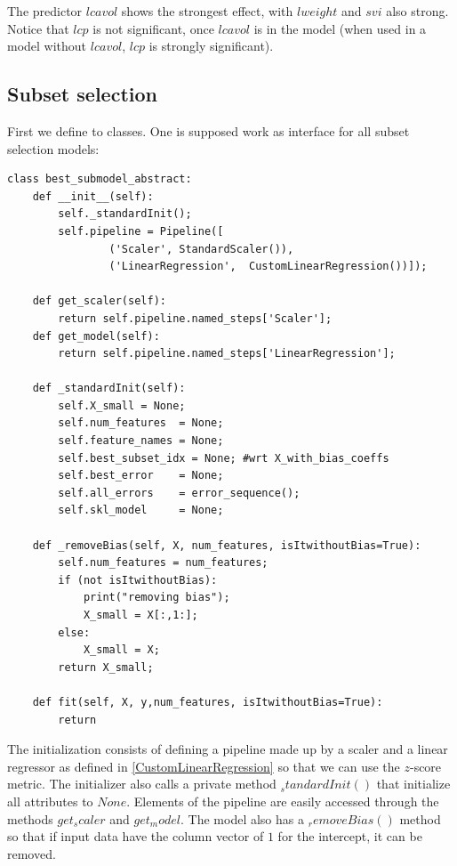\documentclass[12pt, letterpaper]{article}
\theoremstyle{definition}
\begin{document}
The predictor $lcavol$ shows the strongest effect, with $lweight$ and $svi$ also strong. Notice that $lcp$ is not significant, once $lcavol$ is in the model (when used in a model without $lcavol$, $lcp$ is strongly significant).

\subsection{Subset selection}
First we define to classes. One is supposed work as interface for all subset selection models:
\begin{lstlisting}
class best_submodel_abstract:
    def __init__(self):
        self._standardInit();
        self.pipeline = Pipeline([
                ('Scaler', StandardScaler()), 
                ('LinearRegression',  CustomLinearRegression())]);  
    
    def get_scaler(self):
        return self.pipeline.named_steps['Scaler'];
    def get_model(self):
        return self.pipeline.named_steps['LinearRegression'];
        
    def _standardInit(self):
        self.X_small = None;
        self.num_features  = None;
        self.feature_names = None;
        self.best_subset_idx = None; #wrt X_with_bias_coeffs
        self.best_error    = None;
        self.all_errors    = error_sequence();
        self.skl_model     = None;   
        
    def _removeBias(self, X, num_features, isItwithoutBias=True):
        self.num_features = num_features;
        if (not isItwithoutBias):
            print("removing bias");
            X_small = X[:,1:];
        else:
            X_small = X;
        return X_small;
    
    def fit(self, X, y,num_features, isItwithoutBias=True):
        return
\end{lstlisting}
The initialization consists of defining a pipeline made up by a scaler and a linear regressor as defined in \autoref{CustomLinearRegression} so that we can use the $z$-score metric. The initializer also calls a private method $_standardInit()$ that initialize all attributes to $None$. Elements of the pipeline are easily accessed through the methods $get_scaler$ and $get_model$.  The model also has a $_removeBias()$ method so that if input data have the column vector of $1$ for the intercept, it can be removed.
\end{document}
